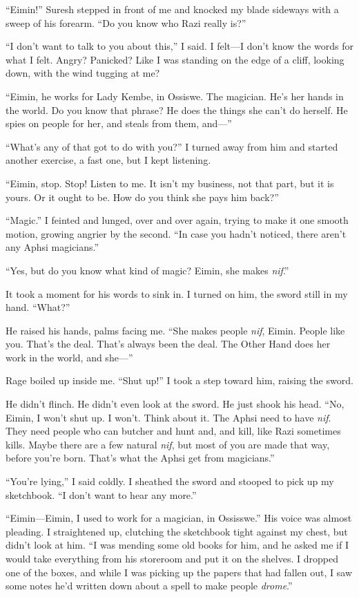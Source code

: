``Eimin!''  Suresh stepped in front of me and knocked my blade sideways
with a sweep of his forearm.  ``Do you know who Razi really is?''

``I don't want to talk to you about this,'' I said.  I felt---I don't
know the words for what I felt.  Angry?  Panicked?  Like I was
standing on the edge of a cliff, looking down, with the wind tugging
at me?

``Eimin, he works for Lady Kembe, in Ossiswe.  The magician.  He's her
hands in the world.  Do you know that phrase?  He does the things she
can't do herself.  He spies on people for her, and steals from them,
and---''

``What's any of that got to do with you?''  I turned away from him and
started another exercise, a fast one, but I kept listening.

``Eimin, stop.  Stop! Listen to me.  It isn't my business, not that
part, but it is yours.  Or it ought to be.  How do you think she pays
him back?''

``Magic.''  I feinted and lunged, over and over again, trying to make it
one smooth motion, growing angrier by the second.  ``In case you hadn't
noticed, there aren't any Aphsi magicians.''

``Yes, but do you know what kind of magic?  Eimin, she makes \emph{nif}.''

It took a moment for his words to sink in.  I turned on him, the sword
still in my hand.  ``What?''

He raised his hands, palms facing me.  ``She makes people \emph{nif}, Eimin.
People like you.  That's the deal.  That's always been the deal.  The
Other Hand does her work in the world, and she---''

Rage boiled up inside me.  ``Shut up!''  I took a step toward him,
raising the sword.

He didn't flinch.  He didn't even look at the sword.  He just shook
his head.  ``No, Eimin, I won't shut up.  I won't.  Think about it.
The Aphsi need to have \emph{nif}.  They need people who can butcher and
hunt and, and kill, like Razi sometimes kills.  Maybe there are a few
natural \emph{nif}, but most of you are made that way, before you're born.
That's what the Aphsi get from magicians.''

``You're lying,'' I said coldly.  I sheathed the sword and stooped to
pick up my sketchbook.  ``I don't want to hear any more.''

``Eimin---Eimin, I used to work for a magician, in Ossisswe.''  His
voice was almost pleading.  I straightened up, clutching the
sketchbook tight against my chest, but didn't look at him.  ``I was
mending some old books for him, and he asked me if I would take
everything from his storeroom and put it on the shelves.  I dropped
one of the boxes, and while I was picking up the papers that had
fallen out, I saw some notes he'd written down about a spell to make
people \emph{drome}.''


